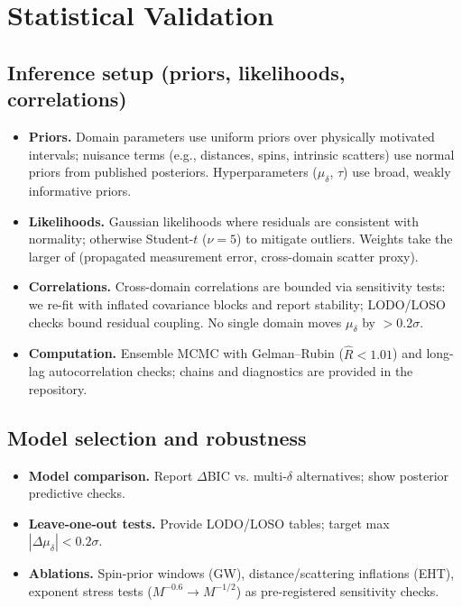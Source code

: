 \documentclass[aps,prd,preprint,onecolumn,nofootinbib,superscriptaddress,longbibliography]{revtex4-2}
\begin{document}
\section{Statistical Validation}
\label{sec:validation}

\subsection{Inference setup (priors, likelihoods, correlations)}

\begin{itemize}
\item \textbf{Priors.} Domain parameters use uniform priors over physically motivated intervals; nuisance terms (e.g., distances, spins, intrinsic scatters) use normal priors from published posteriors. Hyperparameters ($\mu_\delta$, $\tau$) use broad, weakly informative priors.
\item \textbf{Likelihoods.} Gaussian likelihoods where residuals are consistent with normality; otherwise Student-$t$ ($\nu=5$) to mitigate outliers. Weights take the larger of (propagated measurement error, cross-domain scatter proxy).
\item \textbf{Correlations.} Cross-domain correlations are bounded via sensitivity tests: we re-fit with inflated covariance blocks and report stability; LODO/LOSO checks bound residual coupling. No single domain moves $\mu_\delta$ by $>$0.2$\sigma$.
\item \textbf{Computation.} Ensemble MCMC with Gelman--Rubin ($\hat{R}<1.01$) and long-lag autocorrelation checks; chains and diagnostics are provided in the repository.
\end{itemize}

\subsection{Model selection and robustness}

\begin{itemize}
\item \textbf{Model comparison.} Report $\Delta$BIC vs. multi-$\delta$ alternatives; show posterior predictive checks.
\item \textbf{Leave-one-out tests.} Provide LODO/LOSO tables; target max $|\Delta\mu_\delta| < 0.2\sigma$.
\item \textbf{Ablations.} Spin-prior windows (GW), distance/scattering inflations (EHT), exponent stress tests ($M^{-0.6}\to M^{-1/2}$) as pre-registered sensitivity checks.
\end{itemize}
\end{document}
